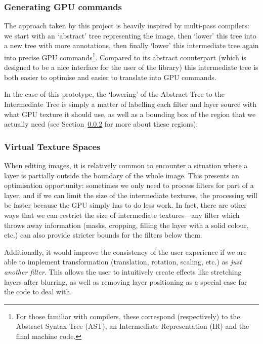 \documentclass[12pt]{article}
\begin{document}
\subsubsection{Generating GPU commands}\label{sec:gpu-cmds}

The approach taken by this project is heavily inspired by multi-pass compilers: we start with an
`abstract' tree representing the image, then `lower' this tree into a new tree with more
annotations, then finally `lower' this intermediate tree again into precise GPU
commands\footnote{For those familiar with compilers, these correspond (respectively) to the Abstract
Syntax Tree (AST), an Intermediate Representation (IR) and the final machine code.}.  Compared to
its abstract counterpart (which is designed to be a nice interface for the user of the library) this
intermediate tree is both easier to optimise and easier to translate into GPU commands.

In the case of this prototype, the `lowering' of the Abstract Tree to the Intermediate Tree is
simply a matter of labelling each filter and layer source with what GPU texture it should use, as
well as a bounding box of the region that we actually need (see Section~\ref{sec:virt-tex-spaces}
for more about these regions).

\subsubsection{Virtual Texture Spaces}\label{sec:virt-tex-spaces}

When editing images, it is relatively common to encounter a situation where a layer is partially
outside the boundary of the whole image.  This presents an optimisation opportunity: sometimes we
only need to process filters for part of a layer, and if we can limit the size of the intermediate
textures, the processing will be faster because the GPU simply has to do less work.  In fact, there
are other ways that we can restrict the size of intermediate textures---any filter which throws away
information (masks, cropping, filling the layer with a solid colour, etc.) can also provide stricter
bounds for the filters below them.

Additionally, it would improve the consistency of the user experience if we are able to implement
transformation (translation, rotation, scaling, etc.) as \emph{just another filter}.  This allows
the user to intuitively create effects like stretching layers after blurring, as well as removing
layer positioning as a special case for the code to deal with.
\end{document}

